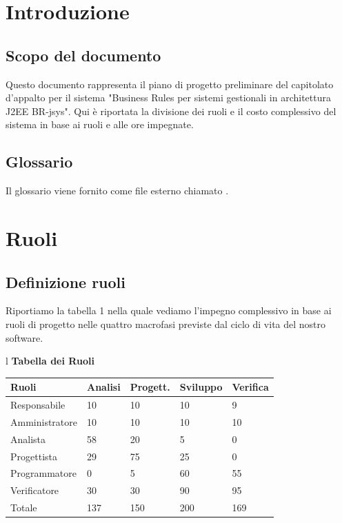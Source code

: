 \documentclass[11pt,titlepage,a4paper]{report}
\begin{document}
\tableofcontents 


\chapter{Introduzione}
\section{Scopo del documento}
Questo documento rappresenta il piano di progetto preliminare
del capitolato d'appalto per il sistema "Business Rules per sistemi
gestionali in architettura J2EE BR-jsys". 
Qui \`e riportata la divisione dei ruoli e il costo complessivo del
sistema in base ai ruoli e alle ore impegnate.

\section{Glossario}
Il glossario viene fornito come file esterno chiamato \Glossario .

\chapter{Ruoli}
\section{Definizione ruoli}
Riportiamo la tabella 1 nella quale vediamo l'impegno
complessivo in base ai ruoli di progetto nelle quattro
macrofasi previste dal ciclo di vita del nostro software.


\begin{table}[hbtp]
\large{
\begin{tabular}{l}
\Large{\textbf{\textsf{Tabella dei Ruoli}}} \\
\begin{tabular}{||p{3cm}||p{2cm}||p{2cm}||p{2cm}||p{2cm}||}
\hline
\textbf{Ruoli} & \textbf{Analisi} & \textbf{Progett.} & \textbf{Sviluppo}
& \textbf{Verifica}\\ \hline
{Responsabile}&10&10&10&9 \\ \hline 
{Amministratore} &10&10&10&10\\ \hline
{Analista}& 58&20&5&0 \\ \hline
{Progettista}&29&75&25&0 \\ \hline
{Programmatore}&0&5&60&55 \\ \hline
{Verificatore}& 30&30&90&95 \\ \hline
{Totale}& 137&150&200&169 \\ \hline
\end{tabular} \\ 
\end{tabular}
}

\end{table}
\end{document}
